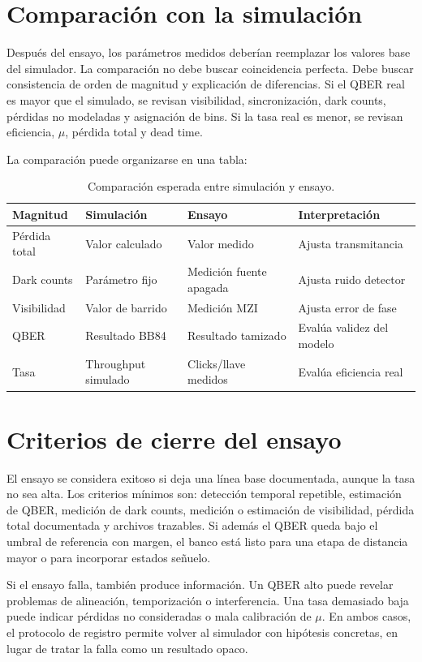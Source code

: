 \section{Comparación con la simulación}

Después del ensayo, los parámetros medidos deberían reemplazar los valores base del simulador. La comparación no debe buscar coincidencia perfecta. Debe buscar consistencia de orden de magnitud y explicación de diferencias. Si el QBER real es mayor que el simulado, se revisan visibilidad, sincronización, dark counts, pérdidas no modeladas y asignación de bins. Si la tasa real es menor, se revisan eficiencia, \(\mu\), pérdida total y dead time.

La comparación puede organizarse en una tabla:

\begin{table}[H]
  \centering
  \begin{tabularx}{\textwidth}{p{}XXX}
    \toprule
    Magnitud & Simulación & Ensayo & Interpretación \\
    \midrule
    Pérdida total & Valor calculado & Valor medido & Ajusta transmitancia \\
    Dark counts & Parámetro fijo & Medición fuente apagada & Ajusta ruido detector \\
    Visibilidad & Valor de barrido & Medición MZI & Ajusta error de fase \\
    QBER & Resultado BB84 & Resultado tamizado & Evalúa validez del modelo \\
    Tasa & Throughput simulado & Clicks/llave medidos & Evalúa eficiencia real \\
    \bottomrule
  \end{tabularx}
  \caption{Comparación esperada entre simulación y ensayo.}
  \label{tab:sim_vs_ensayo}
\end{table}

\section{Criterios de cierre del ensayo}

El ensayo se considera exitoso si deja una línea base documentada, aunque la tasa no sea alta. Los criterios mínimos son: detección temporal repetible, estimación de QBER, medición de dark counts, medición o estimación de visibilidad, pérdida total documentada y archivos trazables. Si además el QBER queda bajo el umbral de referencia con margen, el banco está listo para una etapa de distancia mayor o para incorporar estados señuelo.

Si el ensayo falla, también produce información. Un QBER alto puede revelar problemas de alineación, temporización o interferencia. Una tasa demasiado baja puede indicar pérdidas no consideradas o mala calibración de \(\mu\). En ambos casos, el protocolo de registro permite volver al simulador con hipótesis concretas, en lugar de tratar la falla como un resultado opaco.
